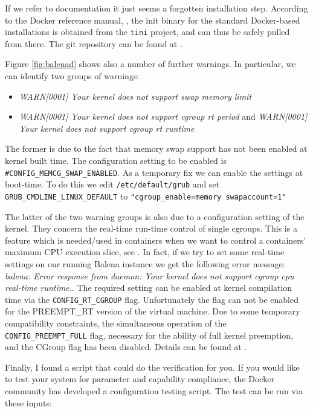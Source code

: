 \documentclass[]{scrartcl}
\begin{document}
If we refer to documentation it just seems a forgotten installation step.
According to the Docker reference manual, \cite{docker03}, the init binary for the standard Docker-based installations is obtained from the \texttt{tini} project, and can thus be safely pulled from there. The git repository can be found at \cite{tini01}.

Figure \ref{fig:balenad} shows also a number of further warnings. In particular, we can identify two groups of warnings:

\begin{itemize}
	\item \textit{WARN[0001] Your kernel does not support swap memory limit}

	\item \textit{WARN[0001] Your kernel does not support cgroup rt period} and \textit{WARN[0001] Your kernel does not support cgroup rt runtime} 
\end{itemize}

The former is due to the fact that memory swap support has not been enabled at kernel built time. 
The configuration setting to be enabled is \texttt{\#CONFIG\_MEMCG\_SWAP\_ENABLED}. As a temporary fix we can enable the settings at boot-time. 
To do this we edit \texttt{/etc/default/grub} and set 
\texttt{GRUB\_CMDLINE\_LINUX\_DEFAULT} to \texttt{"cgroup\_enable=memory swapaccount=1"}

The latter of the two warning groups is also due to a configuration setting of the kernel. They concern the real-time run-time control of single cgroups. This is a feature which is needed/used in containers when we want to control a containers' maximum CPU execution slice, see \cite{docker04}. 
In fact, if we try to set some real-time settings on our running Balena instance we get the following error message: \textit{balena: Error response from daemon: Your kernel does not support cgroup cpu real-time runtime.}.
The required setting can be enabled at kernel compilation time via the \texttt{CONFIG\_RT\_CGROUP} flag. 
%
Unfortunately the flag can not be enabled for the PREEMPT\_RT version of the virtual machine. Due to some temporary compatibility constraints, the simultaneous operation of the \texttt{CONFIG\_PREEMPT\_FULL} flag, necessary for the ability of full kernel preemption, and the CGroup flag has been disabled. Details can be found at \cite{lfnd01}.

Finally, I found a script that could do the verification for you. If you would like to test your system for parameter and capability compliance, the Docker community has developed a configuration testing script. The test can be run via these inputs:
\end{document}
